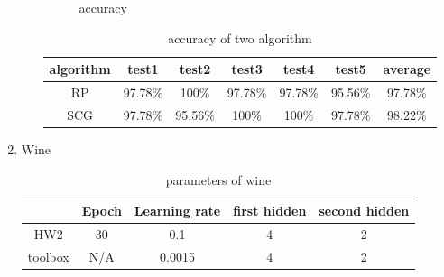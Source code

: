 \documentclass[12pt,a4paper]{article}
\begin{document}
\begin{CJK}{UTF8}{bsmi}
\begin{enumerate}
\begin{enumerate}
\begin{figure}[H]
\begin{subfigure}{.5\textwidth}
		\end{subfigure}
		\caption{accuracy}
		
		\end{figure}
	
		\begin{table}[H]
			\caption{accuracy of two algorithm} %
			\centering %
			\begin{tabular}{c c c c c c c} %
				\hline\hline %
				algorithm & test1 & test2 & test3 & test4 &test5 & average\\ [0.5ex] %
				\hline %
				RP & 97.78\% & 100\% & 97.78\% & 97.78\% & 95.56\% & 97.78\%\\ %
				SCG & 97.78\% & 95.56\% & 100\% & 100\% &97.78\% &98.22\%\\
				[0.5ex] %
				\hline %
			\end{tabular}
		\end{table}

		 \end{enumerate}
	 \newpage
	 
	 \item Wine
	  \begin{enumerate}
	 	\begin{table}[H]
	 		\caption{parameters of wine} %
	 		\centering %
	 		\begin{tabular}{c c c c c} %
	 			\hline\hline %
	 			& Epoch & Learning rate & first hidden & second hidden \\ [0.5ex] %
	 			\hline %
	 			HW2 & 30 & 0.1 & 4 & 2\\ %
	 			toolbox & N/A & 0.0015 & 4 & 2\\
	 			[0.5ex] %
	 			\hline %
	 		\end{tabular}
	 		\label{table:nonlin} %
	 	\end{table}


\end{enumerate}
\end{enumerate}
\end{CJK}
\end{document}
